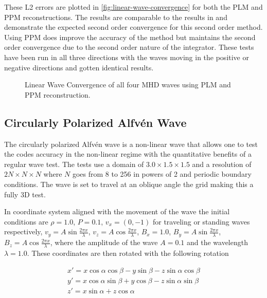 These L2 errors are plotted in \autoref{fig:linear-wave-convergence} for both the PLM and PPM reconstructions. The results are comparable to the results in \cite{stone_2009} and demonstrate the expected second order convergence for this second order method. Using PPM does improve the accuracy of the method but maintains the second order convergence due to the second order nature of the integrator. These tests have been run in all three directions with the waves moving in the positive or negative directions and gotten identical results.

\begin{figure}[ht!]
    \caption{Linear Wave Convergence of all four MHD waves using PLM and PPM reconstruction. }
    \label{fig:linear-wave-convergence}
\end{figure}

\subsection{Circularly Polarized Alfv\'en Wave}
\label{sec:cpaw}

The circularly polarized Alfv\'en wave is a non-linear wave that allows one to test the codes accuracy in the non-linear regime with the quantitative benefits of a regular wave test. The tests use a domain of $3.0\times1.5\times1.5$ and a resolution of $2N\times N \times N$ where $N$ goes from 8 to 256 in powers of 2 and periodic boundary conditions. The wave is set to travel at an oblique angle the grid making this a fully 3D test.

In coordinate system aligned with the movement of the wave the initial conditions are 
$\rho = 1.0$,
$P = 0.1$,
$v_x = (0,-1)$ for traveling or standing waves respectively,
$v_y = A \sin{\frac{2\pi x}{\lambda}}$,
$v_z = A \cos{\frac{2\pi x}{\lambda}}$,
$B_x = 1.0$,
$B_y = A \sin{\frac{2\pi x}{\lambda}}$,
$B_z = A \cos{\frac{2\pi x}{\lambda}}$,
where the amplitude of the wave $A = 0.1$ and the wavelength $\lambda = 1.0$. These coordinates are then rotated with the following rotation

\begin{eqnarray}
    x\prime = x \cos\alpha\cos\beta - y \sin\beta - z \sin\alpha\cos\beta \nonumber \\
    y\prime = x \cos\alpha\sin\beta + y \cos\beta - z \sin\alpha\sin\beta \nonumber \\
    z\prime = x \sin\alpha + z \cos\alpha \nonumber
\end{eqnarray}

